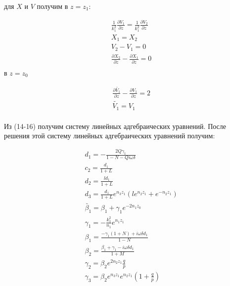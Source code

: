 	для $X$ и $V$ получим в $z = z_1$:
	
	\begin{equation}
		\begin{aligned}
			& \frac{1}{k_1^2} \frac{\partial V_1}{\partial z} = \frac{1}{k_1^2} \frac{\partial V_2}{\partial z} \\
			&X_1 = X_2 \\
			& V_2 - V_1 = 0 \\
			&\frac{\partial X_2}{\partial z} - \frac{\partial X_1}{\partial z} = 0 \\ 
		\end{aligned}
	\end{equation}
	\newpage
	в $z = z_0$
	
	
	\begin{equation}
		\begin{aligned}
			&\frac{\partial \tilde{V_1}}{\partial z} - \frac{\partial V_1}{\partial z} = 2 \\
			&\tilde{V_1} = V_1 \\
		\end{aligned}
	\end{equation}
	
	
	Из (14-16) получим систему линейных адгебраических уравнений. После решения этой систему линейных адгебраических уравнений получим:
	
	\begin{equation}
		\begin{aligned}
			&d_1 = - \frac{2 Q \gamma_1}{1 - N - Qi\omega \delta} \\
			&c_2 = \frac{d_1}{1 + L} \\
			&d_2 = \frac{l d_1}{1 + L} \\
			&d_3 = \frac{d_1}{1 + L} e^{n_3 z_1}(l e^{n_2 z_1} + e^{-n_2 z_1}) \\
			&\tilde{\beta_1} = \beta_1 + \gamma_1 e^{-2 n_1 z_0} \\
			&\gamma_1 = -\frac{k_1^2}{n_1} e^{n_1 z_1} \\
			&\beta_1 = \frac{-\gamma_1(1 + N) + i \omega \delta d_1}{1 - N} \\
			&\beta_2 = \frac{\beta_1 + \gamma_1 - i \omega \delta d_1}{1 + M} \\
			&\gamma_2 = \beta_2 e^{2 n_2 z_1} \frac{q}{p} \\
			&\gamma_3 = \beta_2 e^{n_3 z_1}e^{n_2 z_1}(1 + \frac{q}{p})
			
			
			
		\end{aligned}
		
	\end{equation}
	

